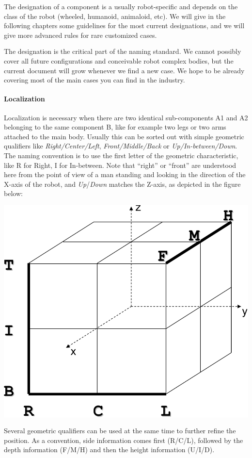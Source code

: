 The designation of a component is a usually robot-specific and depends
on the class of the robot (wheeled, humanoid, animaloid, etc). We will
give in the following chapters some guidelines for the most current
designations, and we will give more advanced rules for rare customized
cases.


The designation is the critical part of the naming standard. We cannot
possibly cover all future configurations and conceivable robot complex
bodies, but the current document will grow whenever we find a new case.
We hope to be already covering most of the main cases you can find in
the industry.

\paragraph{Localization }

Localization is necessary when there are two identical
sub-components A1 and A2 belonging to the same component B, like for
example two legs or two arms attached to the main body. Usually this
can be sorted out with simple geometric qualifiers like
\textit{Right/Center/Left},
\textit{Front/Middle/Back} or
\textit{Up}\textit{/In-between/Down}. The
naming convention is to use the first letter of the geometric
characteristic, like R for Right, I for In-between.
Note that “right” or “front” are understood here from the point of view
of a man standing and looking in the direction of the X-axis of the
robot, and
\textit{Up}/\textit{Down} matches
the Z-axis, as depicted in the figure below:

\begin{center}
  \includegraphics[width=.5\linewidth]{img/cube}
\end{center}

Several geometric qualifiers can be used at the same time to
further refine the position. As a convention, side information comes
first (R/C/L), followed by the depth
information (F/M/H) and then the height
information (U/I/D).


